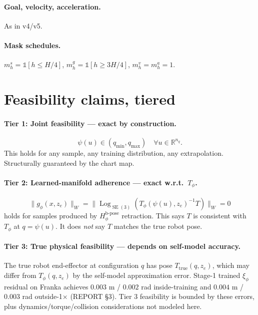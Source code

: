 \documentclass[11pt,a4paper]{article}
\DeclareMathOperator{\Log}{Log}
\DeclareMathOperator{\SE}{SE}
\newcommand{\R}{\mathbb{R}}
\newcommand{\Tphi}{T_\phi}
\newcommand{\Hbpose}{H_\phi^{\text{b-pose}}}
\begin{document}
\paragraph{Goal, velocity, acceleration.} As in v4/v5.

\paragraph{Mask schedules.} $m_h^s = \mathbb{1}[h \leq H/4]$, $m_h^g = \mathbb{1}[h \geq 3H/4]$, $m_h^v = m_h^a = 1$.

\section{Feasibility claims, tiered}
\label{sec:feasibility-tiers}

\paragraph{Tier 1: Joint feasibility — exact by construction.}
\begin{equation}
\psi(u) \in (q_\text{min}, q_\text{max}) \quad \forall u \in \R^{n_q}.
\end{equation}
This holds for any sample, any training distribution, any extrapolation. Structurally guaranteed by the chart map.

\paragraph{Tier 2: Learned-manifold adherence — exact w.r.t.\ $\Tphi$.}
\begin{equation}
\|g_\phi(x, z_e)\|_W = \|\Log_{\SE(3)}(\Tphi(\psi(u), z_e)^{-1} T)\|_W = 0
\end{equation}
holds for samples produced by $\Hbpose$ retraction. This says $T$ is consistent with $\Tphi$ at $q = \psi(u)$. It does \emph{not} say $T$ matches the true robot pose.

\paragraph{Tier 3: True physical feasibility — depends on self-model accuracy.} The true robot end-effector at configuration $q$ has pose $T_\text{true}(q, z_e)$, which may differ from $\Tphi(q, z_e)$ by the self-model approximation error. Stage-1 trained $\xi_\phi$ residual on Franka achieves $0.003$ m / $0.002$ rad inside-training and $0.004$ m / $0.003$ rad outside-1$\times$ (REPORT \S3). Tier 3 feasibility is bounded by these errors, plus dynamics/torque/collision considerations not modeled here.
\end{document}
